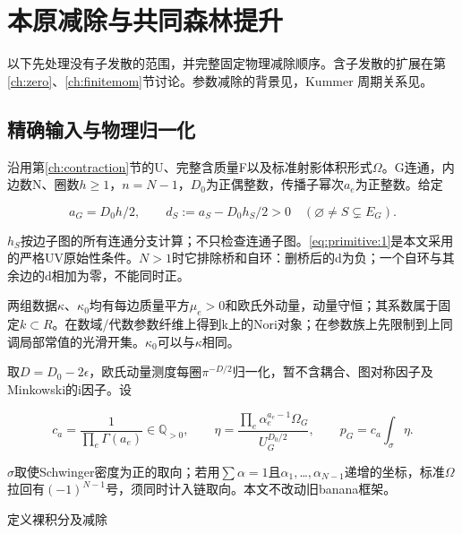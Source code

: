 \documentclass[11pt,a4paper,oneside]{ctexart}
\theoremstyle{cnplain}
\theoremstyle{definition}
\theoremstyle{remark}
\numberwithin{equation}{section}
\begin{document}
\endgroup

\section{本原减除与共同森林提升}\label{ch:primitive}\label{ch:forest}

\begingroup

以下先处理没有子发散的范围，并完整固定物理减除顺序。含子发散的扩展在第\ref{ch:zero}、\ref{ch:finitemom}节讨论。参数减除的背景见\cite{bk2008}，Kummer 周期关系见\cite{brownperiods}。

\subsection{精确输入与物理归一化}\label{sec:primitive:1}

沿用第\ref{ch:contraction}节的U、完整含质量F以及标准射影体积形式\(\Omega \)。G连通，内边数N、圈数\(h\ge 1\)，\(n=N- 1\)，\(D_0\)为正偶整数，传播子幂次\(a_e\)为正整数。给定

\begin{equation}
a_G=D_0h/2,\qquad
 d_S:=a_S-D_0h_S/2>0\quad(\varnothing\ne S\subsetneq E_G).       \label{eq:primitive:1}
\end{equation}

\(h_S\)按边子图的所有连通分支计算；不只检查连通子图。\eqref{eq:primitive:1}是本文采用的严格UV原始性条件。\(N>1\)时它排除桥和自环：删桥后的d为负；一个自环与其余边的d相加为零，不能同时正。

两组数据\(\kappa \)、\(\kappa _0\)均有每边质量平方\(\mu _e>0\)和欧氏外动量，动量守恒；其系数属于固定\(k\subset R\)。在数域/代数参数纤维上得到k上的Nori对象；在参数族上先限制到上同调局部常值的光滑开集。\(\kappa _0\)可以与\(\kappa \)相同。

取\(D=D_0- 2\epsilon \)，欧氏动量测度每圈\(\pi ^{- D/2}\)归一化，暂不含耦合、图对称因子及Minkowski的i因子。设

\begin{equation}
c_a=\frac1{\prod_e\Gamma(a_e)}\in\mathbb Q_{>0},\qquad
 \eta=\frac{\prod_e\alpha_e^{a_e-1}\Omega_G}{U_G^{D_0/2}},\qquad
 p_G=c_a\int_\sigma\eta.                                        \label{eq:primitive:2}
\end{equation}

\(\sigma \)取使Schwinger密度为正的取向；若用\(\sum \alpha =1\)且\(\alpha _1,\)\ldots{}\(,\alpha _{N- 1}\)递增的坐标，标准\(\Omega \)拉回有\((- 1)^{N- 1}\)号，须同时计入链取向。本文不改动旧banana框架。

定义裸积分及减除
\end{document}
